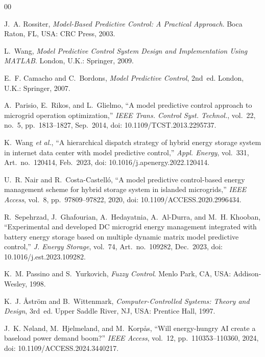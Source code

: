 \documentclass{ieeeaccess}
\begin{document}
\begin{thebibliography}{00}

J.~A. Rossiter, \emph{Model-Based Predictive Control: A Practical Approach}. Boca Raton, FL, USA: CRC Press, 2003.

L.~Wang, \emph{Model Predictive Control System Design and Implementation Using MATLAB}. London, U.K.: Springer, 2009.

E.~F. Camacho and C.~Bordons, \emph{Model Predictive Control}, 2nd~ed. London, U.K.: Springer, 2007.

A.~Parisio, E.~Rikos, and L.~Glielmo, ``A model predictive control approach to microgrid operation optimization,'' \emph{IEEE Trans. Control Syst. Technol.}, vol.~22, no.~5, pp.~1813--1827, Sep.~2014, doi: 10.1109/TCST.2013.2295737.

K.~Wang \emph{et al.}, ``A hierarchical dispatch strategy of hybrid energy storage system in internet data center with model predictive control,'' \emph{Appl. Energy}, vol.~331, Art.~no.~120414, Feb.~2023, doi: 10.1016/j.apenergy.2022.120414.

U.~R. Nair and R.~Costa-Castell{\'o}, ``A model predictive control-based energy management scheme for hybrid storage system in islanded microgrids,'' \emph{IEEE Access}, vol.~8, pp.~97809--97822, 2020, doi: 10.1109/ACCESS.2020.2996434.

R.~Sepehrzad, J.~Ghafourian, A.~Hedayatnia, A.~Al-Durra, and M.~H. Khooban, ``Experimental and developed DC microgrid energy management integrated with battery energy storage based on multiple dynamic matrix model predictive control,'' \emph{J. Energy Storage}, vol.~74, Art.~no.~109282, Dec.~2023, doi: 10.1016/j.est.2023.109282.

K.~M. Passino and S.~Yurkovich, \emph{Fuzzy Control}. Menlo Park, CA, USA: Addison-Wesley, 1998.

K.~J. {\AA}str{\"o}m and B.~Wittenmark, \emph{Computer-Controlled Systems: Theory and Design}, 3rd~ed. Upper Saddle River, NJ, USA: Prentice Hall, 1997.

J.~K. N{\o}land, M.~Hjelmeland, and M.~Korp{\aa}s, ``Will energy-hungry AI create a baseload power demand boom?'' \emph{IEEE Access}, vol.~12, pp.~110353--110360, 2024, doi: 10.1109/ACCESS.2024.3440217.


\end{thebibliography}
\end{document}
